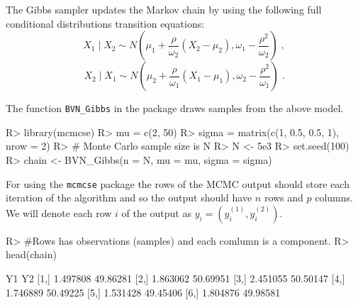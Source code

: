 \documentclass[11pt]{article}
\begin{document}
The Gibbs sampler updates the Markov chain by using the following full conditional distributions transition equations:
\[
X_{1} \mid X_{2} \sim  N\left(\mu_{1} + \dfrac{\rho}{\omega_2}\left(X_{2} - \mu_{2}\right) , \omega_1 - \dfrac{\rho^{2}}{\omega_2}\right) \; ,
\]
\[
X_{2} \mid X_{1} \sim  N\left(\mu_{2} + \dfrac{\rho}{\omega_1}\left(X_{1} - \mu_{1}\right) , \omega_2 - \dfrac{\rho^{2}}{\omega_1}\right) \; .
\]

The function \texttt{BVN\_Gibbs} in the package draws samples from the above model. 

\begin{Schunk}
\begin{Sinput}
R> library(mcmcse)
R> mu = c(2, 50)
R> sigma = matrix(c(1, 0.5, 0.5, 1), nrow = 2)
R> # Monte Carlo sample size is N
R> N <- 5e3
R> set.seed(100)
R> chain <- BVN_Gibbs(n = N, mu = mu, sigma = sigma)
\end{Sinput}
\end{Schunk}

For using the \texttt{mcmcse} package the rows of the MCMC output should store each iteration of the algorithm and so the output should have $n$ rows and $p$ columns. We will denote each row $i$ of the output as $y_i = (y^{(1)}_i, y^{(2)}_i)$.
\begin{Schunk}
\begin{Sinput}
R> #Rows has observations (samples) and each comlumn is a component. 
R> head(chain)
\end{Sinput}
\begin{Soutput}
           Y1       Y2
[1,] 1.497808 49.86281
[2,] 1.863062 50.69951
[3,] 2.451055 50.50147
[4,] 1.746889 50.49225
[5,] 1.531428 49.45406
[6,] 1.804876 49.98581
\end{Soutput}
\end{Schunk}
\end{document}
